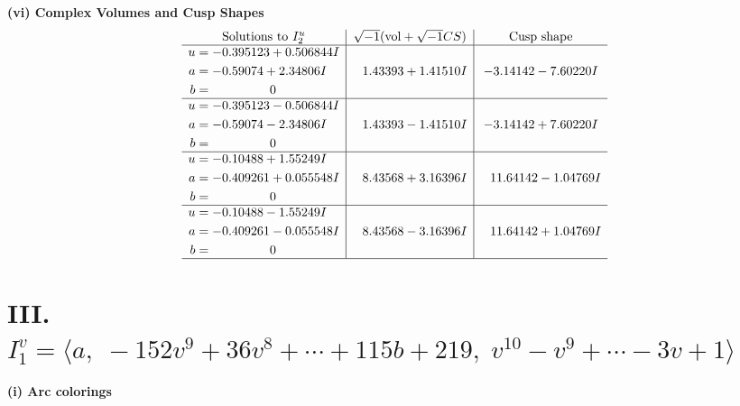 \documentclass[1p]{elsarticle_modified}
\theoremstyle{definition}
\newcommand{\I}{\sqrt{-1}}
\begin{document}
\newpage\flushleft \textbf{(vi) Complex Volumes and Cusp Shapes}
$$\begin{array}{c|c|c}  
\text{Solutions to }I^u_{2}& \I (\text{vol} + \sqrt{-1}CS) & \text{Cusp shape}\\
 \hline 
\begin{aligned}
u &= -0.395123 + 0.506844 I \\
a &= -0.59074 + 2.34806 I \\
b &= \phantom{-0.000000 } 0\end{aligned}
 & \phantom{-}1.43393 + 1.41510 I & -3.14142 - 7.60220 I \\ \hline\begin{aligned}
u &= -0.395123 - 0.506844 I \\
a &= -0.59074 - 2.34806 I \\
b &= \phantom{-0.000000 } 0\end{aligned}
 & \phantom{-}1.43393 - 1.41510 I & -3.14142 + 7.60220 I \\ \hline\begin{aligned}
u &= -0.10488 + 1.55249 I \\
a &= -0.409261 + 0.055548 I \\
b &= \phantom{-0.000000 } 0\end{aligned}
 & \phantom{-}8.43568 + 3.16396 I & \phantom{-}11.64142 - 1.04769 I \\ \hline\begin{aligned}
u &= -0.10488 - 1.55249 I \\
a &= -0.409261 - 0.055548 I \\
b &= \phantom{-0.000000 } 0\end{aligned}
 & \phantom{-}8.43568 - 3.16396 I & \phantom{-}11.64142 + 1.04769 I\\
 \hline 
 \end{array}$$\newpage\newpage\renewcommand{\arraystretch}{1}
\centering \section*{III. $I^v_{1}= \langle a,\;-152 v^9+36 v^8+\cdots+115 b+219,\;v^{10}- v^9+\cdots-3 v+1 \rangle$}
\flushleft \textbf{(i) Arc colorings}\\
\end{document}
